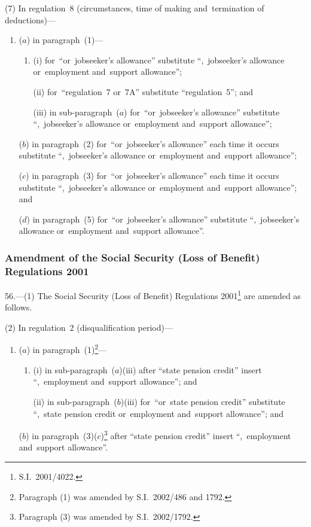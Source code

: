 \documentclass[12pt,a4paper]{article}
\begin{document}
(7) In regulation~8 (circumstances, time of making and~termination of deductions)—
\begin{enumerate}\item[]
($a$) in paragraph~(1)—
\begin{enumerate}\item[]
(i) for~“or~jobseeker’s allowance” substitute “,~jobseeker’s allowance or~employment and~support allowance”;

(ii) for~“regulation~7 or~7A” substitute “regulation~5”; and

(iii) in sub-paragraph~($a$)  for~“or~jobseeker’s allowance” substitute “,~jobseeker’s allowance or~employment and~support allowance”;
\end{enumerate}

($b$) in paragraph~(2) for~“or~jobseeker’s allowance” each time it occurs substitute “,~jobseeker’s allowance or~employment and~support allowance”;

($c$) in paragraph~(3) for~“or~jobseeker’s allowance” each time it occurs substitute “,~jobseeker’s allowance or~employment and~support allowance”; and

($d$) in paragraph~(5) for~“or~jobseeker’s allowance” substitute “,~jobseeker’s allowance or~employment and~support allowance”.
\end{enumerate}

\subsubsection[56. Amendment of the Social Security (Loss of Benefit) Regulations 2001]{Amendment of the Social Security (Loss of Benefit) Regulations 2001}

56.---(1)  The Social Security (Loss of Benefit) Regulations 2001\footnote{S.I.~2001/4022.} are amended as follows.

(2) In regulation~2 (disqualification period)—
\begin{enumerate}\item[]
($a$) in paragraph~(1)\footnote{Paragraph (1) was amended by S.I.~2002/486 and 1792.}—
\begin{enumerate}\item[]
(i) in sub-paragraph~($a$)(iii)  after “state pension credit” insert “,~employment and~support allowance”; and

(ii) in sub-paragraph~($b$)(iii)  for~“or~state pension credit” substitute “,~state pension credit or~employment and~support allowance”; and
\end{enumerate}

($b$) in paragraph~(3)($c$)\footnote{Paragraph (3) was amended by S.I.~2002/1792.} after “state pension credit” insert “,~employment and~support allowance”.
\end{enumerate}
\end{document}

